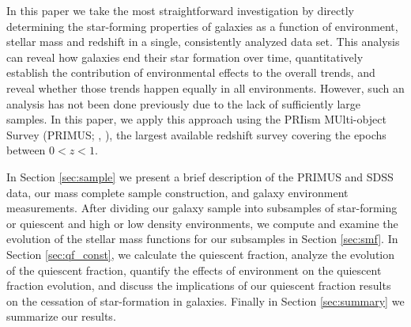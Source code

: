 \documentclass{emulateapj}
\begin{document}


In this paper we take the most straightforward investigation
by directly determining the star-forming properties of galaxies
as a function of environment, stellar mass and redshift in a single,
consistently analyzed data set. This analysis can reveal how galaxies
end their star formation over time, quantitatively establish the
contribution of environmental effects to the overall trends, and
reveal whether those trends happen equally in all environments.
However, such an analysis has not been done previously due to the lack
of sufficiently large samples. In this paper, we apply this approach
using the PRIism MUlti-object Survey (PRIMUS; \citealt{Coil:2011aa},
\citealt{Cool:2013aa}), the largest available redshift survey covering
the epochs between $0<z<1$.

In Section \ref{sec:sample} we present a brief description of the
PRIMUS and SDSS data, our mass complete sample construction, and
galaxy environment measurements. After dividing our galaxy sample into
subsamples of star-forming or quiescent and high or low density
environments, we compute and examine the evolution of the stellar mass
functions for our subsamples in Section \ref{sec:smf}. In
Section \ref{sec:qf_const}, we calculate the quiescent fraction,
analyze the evolution of the quiescent fraction, quantify the effects
of environment on the quiescent fraction evolution, and discuss the
implications of our quiescent fraction results on the cessation of
star-formation in galaxies. Finally in Section \ref{sec:summary} we
summarize our results.
\end{document}

